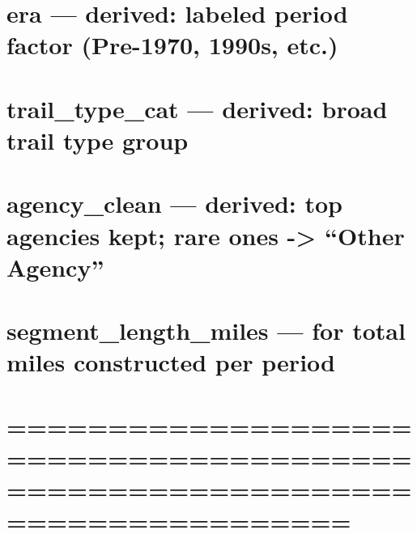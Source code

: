 \documentclass[
]{article}
\begin{document}
\section{era --- derived: labeled period factor (Pre-1970, 1990s,
etc.)}\label{era-derived-labeled-period-factor-pre-1970-1990s-etc.}

\section{trail\_type\_cat --- derived: broad trail type
group}\label{trail_type_cat-derived-broad-trail-type-group}

\section{agency\_clean --- derived: top agencies kept; rare ones
-\textgreater{} ``Other
Agency''}\label{agency_clean-derived-top-agencies-kept-rare-ones---other-agency}

\section{segment\_length\_miles --- for total miles constructed per
period}\label{segment_length_miles-for-total-miles-constructed-per-period}

\section{=============================================================================}\label{section-20}
\end{document}
